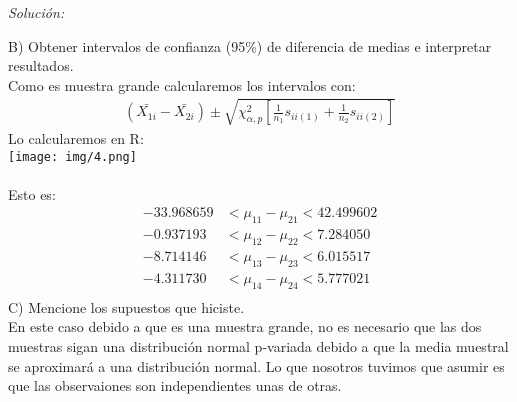 \documentclass[12pt]{article}
\newenvironment{sol}
    {\emph{Solución:}
    }
    {
    }
\begin{document}
\begin{sol}
\pagebreak
B) Obtener intervalos de confianza (95\%) de diferencia de medias e interpretar resultados.\\
Como es muestra grande calcularemos los intervalos con:
\begin{align*}
(\bar{X_{1i}}-\bar{X_{2i}}) \pm \sqrt{\chi_{\alpha, p}^2 \left[\frac{1}{n_1}s_{ii(1)}+\frac{1}{n_2}s_{ii(2)} \right] }
\end{align*}
Lo calcularemos en R:\\
\texttt{[image: img/4.png]}\\\\
Esto es:
\begin{align*}
-33.968659 &< \mu_{11} - \mu_{21} < 42.499602 \\
-0.937193  &< \mu_{12} - \mu_{22} < 7.284050 \\
-8.714146  &< \mu_{13} - \mu_{23} < 6.015517  \\
-4.311730  &< \mu_{14} - \mu_{24} < 5.777021  \\
\end{align*}
C) Mencione los supuestos que hiciste.\\
En este caso debido a que es una muestra grande, no es necesario que las dos muestras sigan una distribución normal p-variada debido a que la media muestral se aproximará a una distribución normal. Lo que nosotros tuvimos que asumir es que las observaiones son independientes unas de otras.

\end{sol}

\end{document}
